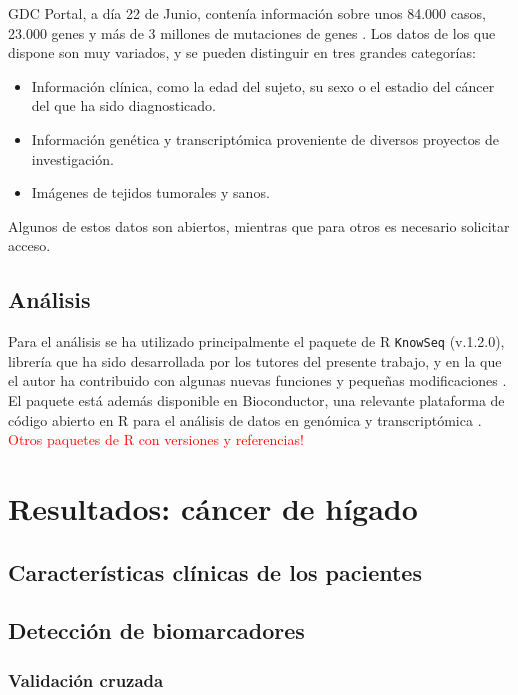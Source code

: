 GDC Portal, a día 22 de Junio, contenía información sobre unos 84.000 casos, 23.000 genes y más de 3 millones de mutaciones de genes \cite{GDCPortal}. Los datos de los que dispone son muy variados, y se pueden distinguir en tres grandes categorías:

\begin{itemize}
	\item Información clínica, como la edad del sujeto, su sexo o el estadio del cáncer del que ha sido diagnosticado.
	\item Información genética y transcriptómica proveniente de diversos proyectos de investigación.
	\item Imágenes de tejidos tumorales y sanos.
\end{itemize} 

Algunos de estos datos son abiertos, mientras que para otros es necesario solicitar acceso.

\subsection{Análisis}

Para el análisis se ha utilizado principalmente el paquete de R \texttt{KnowSeq} (v.1.2.0), librería que ha sido desarrollada por los tutores del presente trabajo, y en la que el autor ha contribuido con algunas nuevas funciones y pequeñas modificaciones \cite{KnowSeq}. El paquete está además disponible en Bioconductor, una relevante plataforma de código abierto en R para el análisis de datos en genómica y transcriptómica \cite{Gentleman2004}.\\

\textcolor{red}{Otros paquetes de R con versiones y referencias!}

\section{Resultados: cáncer de hígado}

\subsection{Características clínicas de los pacientes}

\subsection{Detección de biomarcadores}

\subsubsection{Validación cruzada}

